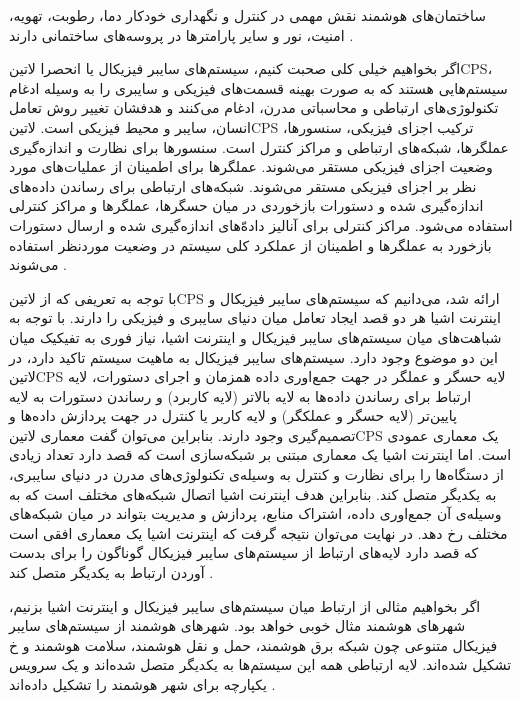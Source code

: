 ساختمان‌های هوشمند نقش مهمی در کنترل و نگهداری خودکار دما، رطوبت، تهویه، امنیت، نور و سایر پارامترها در پروسه‌های ساختمانی
دارند
.


اگر بخواهیم خیلی کلی صحبت کنیم، سیستم‌های سایبر فیزیکال یا انحصرا ‌لاتین{CPS}، سیستم‌هایی هستند که به صورت بهینه قسمت‌های فیزیکی و سایبری را به وسیله ادغام تکنولوژی‌های ارتباطی و محاسباتی مدرن،
ادغام می‌کنند و هدفشان تغییر روش تعامل انسان، سایبر و محیط فیزیکی است.
‌لاتین{CPS} ترکیب اجزای فیزیکی، سنسورها، عملگرها، شبکه‌های ارتباطی و مراکز کنترل است. سنسورها برای نظارت و اندازه‌گیری وضعیت اجزای فیزیکی مستقر می‌شوند.
عملگرها برای اطمینان از عملیات‌های مورد نظر بر اجزای فیزیکی مستقر می‌شوند. شبکه‌های ارتباطی برای رساندن داده‌های اندازه‌گیری شده و دستورات بازخوردی در میان حسگرها، عملگرها و مراکز کنترلی استفاده می‌شود.
مراکز کنترلی برای آنالیز داده‌ّهای اندازه‌گیری شده و ارسال دستورات بازخورد به عملگرها و اطمینان از عملکرد کلی سیستم در وضعیت موردنظر استفاده می‌شوند
.

با توجه به تعریفی که از ‌لاتین{CPS} ارائه شد، می‌دانیم که سیستم‌های سایبر فیزیکال و اینترنت اشیا هر دو قصد ایجاد تعامل میان دنیای سایبری و فیزیکی را دارند.
با توجه به شباهت‌های میان سیستم‌های سایبر فیزیکال و اینترنت اشیا، نیاز فوری به تفیکیک میان این دو موضوع وجود دارد.
سیستم‌های سایبر فیزیکال به ماهیت سیستم تاکید دارد، در ‌لاتین{CPS} لایه حسگر و عملگر در جهت جمع‌اوری داده همزمان و اجرای دستورات،
لایه ارتباط برای رساندن داده‌ها به لایه بالاتر (لایه کاربرد) و رساندن دستورات به لایه پایین‌تر (لایه حسگر و عملکگر) و لایه کاربر یا کنترل در جهت پردازش داده‌ها
و تصمیم‌گیری وجود دارند. بنابراین می‌توان گفت معماری ‌لاتین{CPS} یک معماری عمودی است.
اما اینترنت اشیا یک معماری مبتنی بر شبکه‌سازی است که قصد دارد تعداد زیادی از دستگاه‌ها را برای نظارت و کنترل به وسیله‌ی تکنولوژی‌های مدرن در دنیای سایبری، به یکدیگر متصل کند.
بنابراین هدف اینترنت اشیا اتصال شبکه‌های مختلف است که به وسیله‌ی آن جمع‌اوری داده، اشتراک منابع، پردازش و مدیریت بتواند در میان شبکه‌های مختلف رخ دهد.
در نهایت می‌توان نتیجه گرفت که اینترنت اشیا یک معماری افقی است که قصد دارد لایه‌های ارتباط از سیستم‌های سایبر فیزیکال گوناگون را برای بدست آوردن ارتباط به یکدیگر متصل کند
.

اگر بخواهیم مثالی از ارتباط میان سیستم‌های سایبر فیزیکال و اینترنت اشیا بزنیم، شهرهای هوشمند مثال خوبی خواهد بود. شهرهای هوشمند از سیستم‌های سایبر فیزیکال متنوعی چون
شبکه برق هوشمند، حمل و نقل هوشمند، سلامت هوشمند و ‌خ تشکیل شده‌اند. لایه ارتباطی همه این سیستم‌ها به یکدیگر متصل شده‌اند و یک سرویس یکپارچه برای شهر هوشمند را
تشکیل داده‌اند
.

